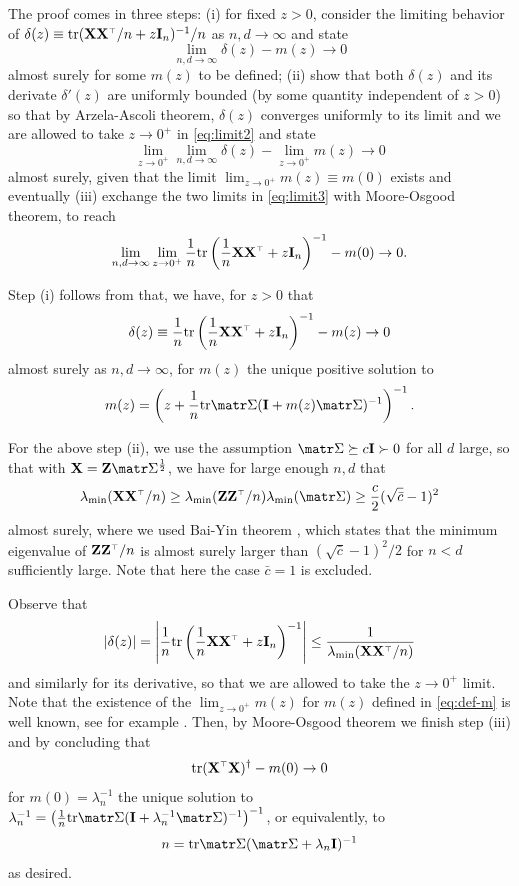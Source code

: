 \documentclass[../../thesis.tex]{subfiles}
\begin{document}
The proof comes in three steps: (i) for fixed $z > 0$, consider the limiting behavior of $ \delta(z) \equiv \tr (\X \X^\top/n + z \I_n)^{-1}/n$ as $n,d \to \infty$ and state
\begin{equation}\label{eq:limit2}
  \lim_{n,d \to \infty} \delta(z) - m(z) \to 0
\end{equation}
almost surely for some $m(z)$ to be defined; (ii) show that both $\delta(z)$ and its derivate $\delta'(z)$ are uniformly bounded (by some quantity independent of $z>0$) so that by Arzela-Ascoli theorem, $\delta(z)$ converges uniformly to its limit and we are allowed to take $z \to 0^+$ in \eqref{eq:limit2} and state
\begin{equation}\label{eq:limit3}
  \lim_{z \to 0^+} \lim_{n,d \to \infty} \delta(z) - \lim_{z \to 0^+} m(z) \to 0
\end{equation}
almost surely, given that the limit $\lim_{z \to 0^+} m(z) \equiv m(0)$ exists and eventually (iii) exchange the two limits in \eqref{eq:limit3} with Moore-Osgood theorem, to reach
\[
  \lim_{n,d \to \infty} \lim_{z \to 0^+} \frac1n \tr \left(\frac1n \X \X^\top + z \I_n \right)^{-1} - m(0) \to 0.
\]

Step (i) follows from \cite{silverstein1995empirical} that, we have, for $z > 0$ that
\[
  \delta(z) \equiv \frac1n \tr \left( \frac1n \X \X^\top  + z \I_n \right)^{-1}  - m(z) \to 0
\]
almost surely as $n,d \to \infty$, for $m(z)$ the unique positive solution to
\begin{equation}\label{eq:def-m}
  m(z) = \left( z + \frac1n \tr \Sigmab (\I + m(z) \Sigmab)^{-1} \right)^{-1}.
\end{equation}

For the above step (ii), we use the assumption $\Sigmab \succeq c \I \succ 0$
for all $d$ large, so that with $\X = \Z \Sigmab^{\frac12}$, we have for large enough $n,d$ that
\[
  \lambda_{\min} (\X \X^\top/n) \ge \lambda_{\min} (\Z \Z^\top/n) \lambda_{\min} (\Sigmab) \ge \frac{c}2 (\sqrt{\bar c} - 1 )^2
\]
almost surely, where we used Bai-Yin theorem \cite{bai1993limit}, which states that the minimum eigenvalue of $\Z \Z^\top/n$ is almost surely larger than $( \sqrt{\bar c} - 1 )^2/2$ for $n<d$ sufficiently large. Note that here the case $\bar c = 1$ is excluded.

Observe that
\[
  |\delta(z)| = \left| \frac1n \tr \left( \frac1n \X \X^\top  + z \I_n \right)^{-1} \right| \le \frac1{ \lambda_{\min} (\X \X^\top/n) }
\]
and similarly for its derivative, so that we are allowed to take the $z \to 0^+$ limit. Note that the existence of the $\lim_{z \to 0^+} m(z)$ for $m(z)$ defined in \eqref{eq:def-m} is well known, see for example \cite{ledoit2011eigenvectors}. Then, by Moore-Osgood theorem we finish step (iii) and by concluding that
\[
  \tr (\X^\top \X)^\dagger - m(0) \to 0
\]
for $m(0) = \lambda_n^{-1}$ the unique solution to $\lambda_n^{-1} = \left( \frac1n \tr \Sigmab (\I + \lambda_n^{-1} \Sigmab)^{-1} \right)^{-1}$, or equivalently, to
\[
  n = \tr \Sigmab (\Sigmab + \lambda_n \I)^{-1}
\]
as desired.
\end{document}
